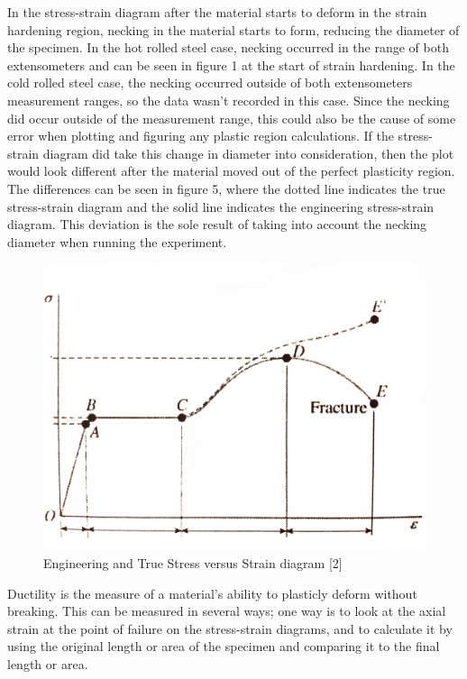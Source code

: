 \documentclass[12pt]{report}
\begin{document}
In the stress-strain diagram after the material starts to deform in the strain hardening region, necking in the material starts to form, reducing the diameter of the specimen. In the hot rolled steel case, necking occurred in the range of both extensometers and can be seen in figure 1 at the start of strain hardening. In the cold rolled steel case, the necking occurred outside of both extensometers measurement ranges, so the data wasn't recorded in this case. Since the necking did occur outside of the measurement range, this could also be the cause of some error when plotting and figuring any plastic region calculations. If the stress-strain diagram did take this change in diameter into consideration, then the plot would look different after the material moved out of the perfect plasticity region. The differences can be seen in figure 5, where the dotted line indicates the true stress-strain diagram and the solid line indicates the engineering stress-strain diagram. This deviation is the sole result of taking into account the necking diameter when running the experiment.

\begin{figure}[H]
	\includegraphics[width=1\textwidth]{true_stress_vs_strain.png}
	\caption{Engineering and True Stress versus Strain diagram [2]}
	\label{fig:Figure5}
\end{figure}

Ductility is the measure of a material's ability to plasticly deform without breaking. This can be measured in several ways; one way is to look at the axial strain at the point of failure on the stress-strain diagrams, and to calculate it by using the original length or area of the specimen and comparing it to the final length or area.
\end{document}
